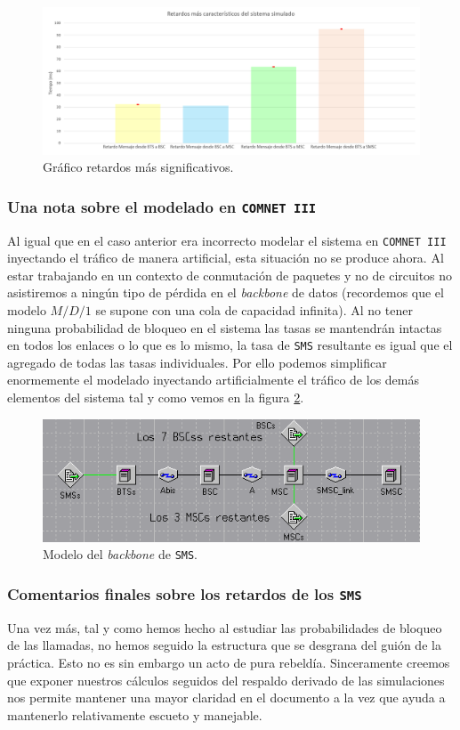 \documentclass[10pt]{article}
\begin{document}
			\begin{figure}
					\centering
					\includegraphics[width=0.75\linewidth]{message_delays.png}
					\caption{Gráfico retardos más significativos.}
					\label{f:graf_mess_del}
			\end{figure}

			\subsubsection{Una nota sobre el modelado en \texttt{COMNET III}}
				Al igual que en el caso anterior era incorrecto modelar el sistema en \texttt{COMNET III} inyectando el tráfico de manera artificial, esta situación no se produce ahora. Al estar trabajando en un contexto de conmutación de paquetes y no de circuitos no asistiremos a ningún tipo de pérdida en el \textit{backbone} de datos (recordemos que el modelo $M/D/1$ se supone con una cola de capacidad infinita). Al no tener ninguna probabilidad de bloqueo en el sistema las tasas se mantendrán intactas en todos los enlaces o lo que es lo mismo, la tasa de \texttt{SMS} resultante es igual que el agregado de todas las tasas individuales. Por ello podemos simplificar enormemente el modelado inyectando artificialmente el tráfico de los demás elementos del sistema tal y como vemos en la figura \ref{f:sms_system}.

				\begin{figure}
					\centering
					\includegraphics[width=0.5\linewidth]{sms_system.png}
					\caption{Modelo del \textit{backbone} de \texttt{SMS}.}
					\label{f:sms_system}
				\end{figure}

			\subsubsection{Comentarios finales sobre los retardos de los \texttt{SMS}}
				Una vez más, tal y como hemos hecho al estudiar las probabilidades de bloqueo de las llamadas, no hemos seguido la estructura que se desgrana del guión de la práctica. Esto no es sin embargo un acto de pura rebeldía. Sinceramente creemos que exponer nuestros cálculos seguidos del respaldo derivado de las simulaciones nos permite mantener una mayor claridad en el documento a la vez que ayuda a mantenerlo relativamente escueto y manejable.
\end{document}
